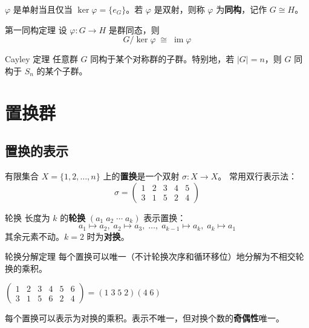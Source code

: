 $\varphi$ 是单射当且仅当 $\ker\varphi = \{e_G\}$。若 $\varphi$ 是双射，则称 $\varphi$ 为\textbf{同构}，记作 $G \cong H$。

\begin{myTheorem}{第一同构定理}
设 $\varphi: G \to H$ 是群同态，则
\[
\boxed{G / \ker\varphi \;\cong\; \operatorname{im}\varphi}
\]
\end{myTheorem}

\begin{myTheorem}{Cayley 定理}
任意群 $G$ 同构于某个对称群的子群。特别地，若 $|G|=n$，则 $G$ 同构于 $S_n$ 的某个子群。
\end{myTheorem}

\section{置换群}

\subsection{置换的表示}

\begin{mydefinition}{}
有限集合 $X = \{1,2,\dots,n\}$ 上的\textbf{置换}是一个双射 $\sigma: X \to X$。
常用双行表示法：
\[
\sigma = \begin{pmatrix}
1 & 2 & 3 & 4 & 5 \\
3 & 1 & 5 & 2 & 4
\end{pmatrix}
\]
\end{mydefinition}

\begin{mydefinition}{轮换}
长度为 $k$ 的\textbf{轮换} $(a_1\;a_2\;\cdots\;a_k)$ 表示置换：
\[
a_1\mapsto a_2,\; a_2\mapsto a_3,\;\dots,\; a_{k-1}\mapsto a_k,\; a_k\mapsto a_1
\]
其余元素不动。$k=2$ 时为\textbf{对换}。
\end{mydefinition}

\begin{myTheorem}{轮换分解定理}
每个置换可以唯一（不计轮换次序和循环移位）地分解为不相交轮换的乘积。
\end{myTheorem}

\begin{example}
$\begin{pmatrix}1&2&3&4&5&6\\ 3&1&5&6&2&4\end{pmatrix} = (1\;3\;5\;2)(4\;6)$
\end{example}

\begin{myTheorem}{}
每个置换可以表示为对换的乘积。表示不唯一，但对换个数的\textbf{奇偶性}唯一。
\end{myTheorem}

